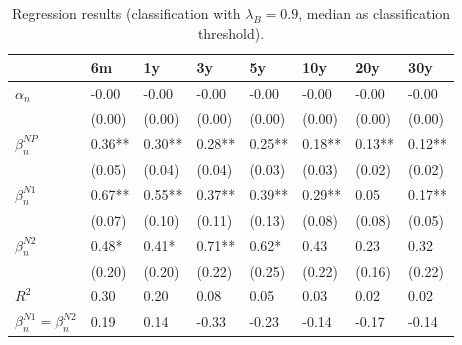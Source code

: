 \documentclass[11pt,a4paper,english,oneside]{book}
\numberwithin{equation}{chapter}
\begin{document}
\begin{table}[h] %
	\centering %
	\begin{tabular}{ p{2cm}  p{1cm} p{1cm} p{1cm} p{1cm} p{1cm} p{1cm} p{1cm} } %
		\toprule %
		& 6m 		& 1y 		& 3y 		& 5y 		& 10y 		& 20y 		& 30y \\
		\midrule %
		$\alpha_n$ & -0.00 & -0.00 & -0.00 & -0.00 & -0.00 & -0.00 & -0.00\\
		& (0.00) & (0.00) & (0.00) & (0.00) & (0.00) & (0.00) & (0.00)\\
		$\beta_n^{NP}$ & 0.36** & 0.30** & 0.28** & 0.25** & 0.18** & 0.13** & 0.12**\\
		& (0.05) & (0.04) & (0.04) & (0.03) & (0.03) & (0.02) & (0.02)\\
		$\beta_n^{N1}$ & 0.67** & 0.55** & 0.37** & 0.39** & 0.29** & 0.05 & 0.17**\\
		& (0.07) & (0.10) & (0.11) & (0.13) & (0.08) & (0.08) & (0.05)\\
		$\beta_n^{N2}$ & 0.48* & 0.41* & 0.71** & 0.62* & 0.43 & 0.23 & 0.32\\
		& (0.20) & (0.20) & (0.22) & (0.25) & (0.22) & (0.16) & (0.22)\\
		$R^2$ & 0.30 & 0.20 & 0.08 & 0.05 & 0.03 & 0.02 & 0.02\\
		$\beta_n^{N1} = \beta_n^{N2}$ & 0.19 & 0.14 & -0.33 & -0.23 & -0.14 & -0.17 & -0.14\\
		\bottomrule %
	\end{tabular}
	\caption{Regression results (classification with $\lambda_B=0.9$, median as classification threshold).} %
	\label{tab:reg3Mod} %
\end{table}
\end{document}
